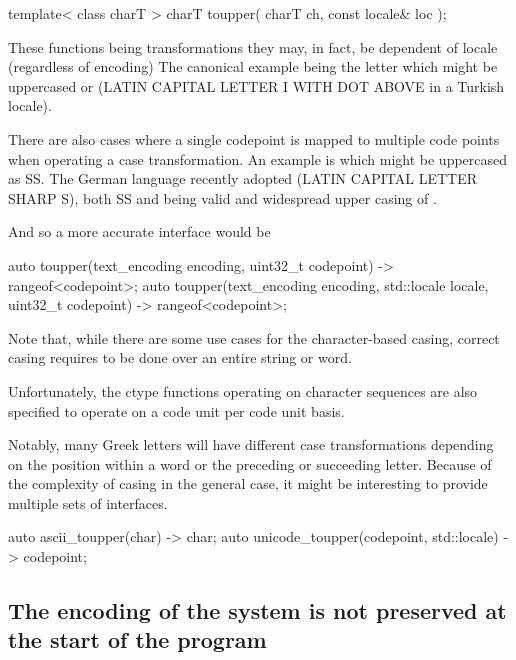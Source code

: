 \documentclass{wg21}
\newcommand{\UnicodeLetter}[1]{\textbf{\textcolor{BrickRed}{\Large\tcode{#1}}}}
\begin{document}
\begin{codeblock}
template< class charT >
charT toupper( charT ch, const locale& loc );
\end{codeblock}

These functions being transformations they may, in fact, be dependent of locale (regardless of encoding)
The canonical example being the letter \UnicodeLetter{i} which might be uppercased \UnicodeLetter{I} or \UnicodeLetter{İ} (LATIN CAPITAL LETTER I WITH DOT ABOVE in a Turkish locale).

There are also cases where a single codepoint is mapped to multiple code points when operating a case transformation.
An example is \UnicodeLetter{ß} which might be uppercased as SS. The German language recently adopted \UnicodeLetter{ẞ} (LATIN CAPITAL LETTER SHARP S), both SS and \UnicodeLetter{ẞ} being valid and widespread upper casing of \UnicodeLetter{ß}.

And so a more accurate interface would be

\begin{codeblock}
auto toupper(text_encoding encoding, 
uint32_t codepoint) -> rangeof<codepoint>;
auto toupper(text_encoding encoding, std::locale locale, uint32_t codepoint) -> rangeof<codepoint>;
\end{codeblock}


Note that, while there are some use cases for the character-based casing, correct casing requires to be done over an entire string or word.

Unfortunately, the ctype functions operating on character sequences are also specified to operate on a code unit per code unit basis.  

Notably, many Greek letters will have different case transformations depending on the position within a word or the preceding or succeeding letter.
Because of the complexity of casing in the general case, it might be interesting to provide multiple sets of interfaces.

\begin{codeblock}

auto ascii_toupper(char) -> char;
auto unicode_toupper(codepoint, std::locale) -> codepoint;

\end{codeblock}

\subsection{The encoding of the system is not preserved at the start of the program}
\end{document}
